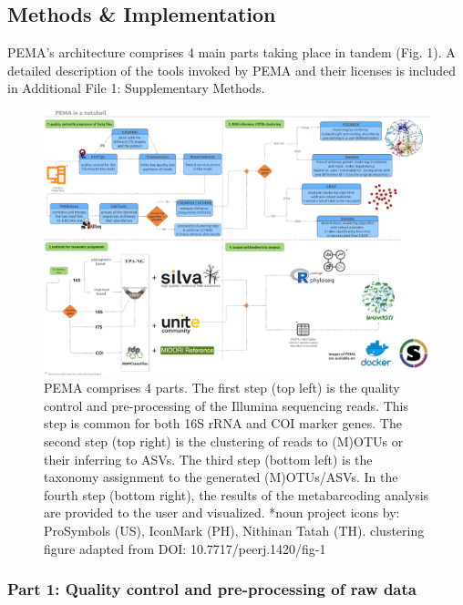    \subsection{Methods \& Implementation}

   PEMA's architecture comprises 4 main parts taking place in tandem (Fig. 1). A detailed description of the tools invoked by PEMA and their licenses is included in Additional File 1: Supplementary Methods.

   \begin{figure}[h]
      \centering
      \includegraphics[width=0.95\columnwidth]{figures/pema_workflow.jpeg}
      \caption{PEMA comprises 4 parts. The first step (top left) is the quality control and pre-processing of the Illumina sequencing reads. This step is common for both 16S rRNA and COI marker genes. The second step (top right) is the clustering of reads to (M)OTUs or their inferring to ASVs. The third step (bottom left) is the taxonomy assignment to the generated (M)OTUs/ASVs. In the fourth step (bottom right), the results of the metabarcoding analysis are provided to the user and visualized. *noun project icons by: ProSymbols (US), IconMark (PH), Nithinan Tatah (TH). clustering figure adapted from DOI: 10.7717/peerj.1420/fig-1}
   \end{figure}


   \subsubsection*{Part 1: Quality control and pre-processing of raw data}

